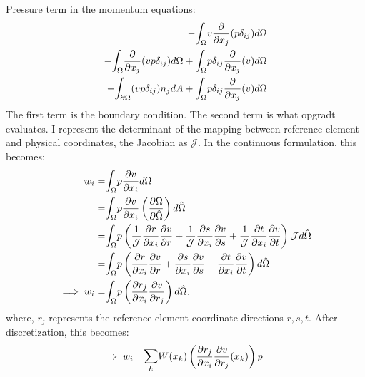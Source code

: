 \documentclass{kthreport}
\begin{document}
Pressure term in the momentum equations:
\begin{eqnarray}
	 - \mathlarger\int_{\Omega} v\dfrac{\partial }{\partial x_{j}}(p\delta_{ij}) d\Omega \nonumber \\
				  -\mathlarger\int_{\Omega} \dfrac{\partial }{\partial x_{j}}(vp\delta_{ij}) d\Omega + \mathlarger\int_{\Omega} p\delta_{ij}\dfrac{\partial }{\partial x_{j}}(v) d\Omega \nonumber \\
				  -\mathlarger\int_{\partial\Omega} (vp\delta_{ij}) n_{j} dA + \mathlarger\int_{\Omega} p\delta_{ij}\dfrac{\partial }{\partial x_{j}}(v) d\Omega \nonumber 
\end{eqnarray}
The first term is the boundary condition. The second term is what opgradt evaluates. I represent the determinant of the mapping between reference element and physical coordinates, the Jacobian as $\mathcal{J}$. In the continuous formulation, this becomes:
\begin{eqnarray}
	w_{i}	=& \mathlarger\int_{\Omega} p\dfrac{\partial v}{\partial x_{i}} d\Omega \nonumber \\
				 =& \mathlarger\int_{\Omega} p\dfrac{\partial v}{\partial x_{i}} \left(\dfrac{\partial \Omega}{\partial \hat{\Omega}}\right) d\hat{\Omega} \nonumber \\
				 =& \mathlarger\int_{\Omega} p\left(\dfrac{1}{\mathcal{J}}\dfrac{\partial r}{\partial x_{i}}\dfrac{\partial v}{\partial r} + \dfrac{1}{\mathcal{J}}\dfrac{\partial s}{\partial x_{i}}\dfrac{\partial v}{\partial s} + \dfrac{1}{\mathcal{J}}\dfrac{\partial t}{\partial x_{i}}\dfrac{\partial v}{\partial t}\right)\mathcal{J} d\hat{\Omega} \nonumber \\
				=& \mathlarger\int_{\Omega} p\left(\dfrac{\partial r}{\partial x_{i}}\dfrac{\partial v}{\partial r} + \dfrac{\partial s}{\partial x_{i}}\dfrac{\partial v}{\partial s} + \dfrac{\partial t}{\partial x_{i}}\dfrac{\partial v}{\partial t}\right) d\hat{\Omega} \nonumber \\
\implies w_{i}	=& \mathlarger\int_{\Omega} p\left(\dfrac{\partial r_{j}}{\partial x_{i}}\dfrac{\partial v}{\partial r_{j}}\right) d\hat{\Omega},
\end{eqnarray}
where, $r_{j}$ represents the reference element coordinate directions $r,s,t$.
After discretization, this becomes:
\begin{eqnarray}
	\implies w_{i}	=& \mathlarger\sum_{k} W(x_{k})\left(\dfrac{\partial r_{j}}{\partial x_{i}}\dfrac{\partial v}{\partial r_{j}}(x_{k})\right)p  \nonumber
\end{eqnarray}
\end{document}
